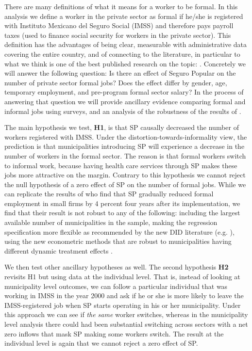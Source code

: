 \documentclass[oneside,11pt]{article}
\begin{document}
There are many definitions of what it means for a worker to be formal. In this analysis we define a worker in the private sector as formal if he/she is registered with Instituto Mexicano del Seguro Social (IMSS) and therefore pays payroll taxes (used to finance social security for workers in the private sector). This definition has the advantages of being clear, measurable with administrative data covering the entire country, and of connecting to the literature, in particular to what we think is one of the best published research on the topic: \cite{Campos}. Concretely we will answer the following question: Is there an effect of Seguro Popular on the number of private sector formal jobs? Does the effect differ by gender, age, temporary employment, and pre-program formal sector salary? In the process of answering that question we will provide ancillary evidence comparing formal and informal jobs using surveys, and an analysis of the robustness of the results of \cite{Campos}.

The main hypothesis we test, \textbf{H1}, is that SP causally decreased the number of workers registered with IMSS. Under the distortion-towards-informality view, the prediction is that municipalities introducing SP will experience a decrease in the number of workers in the formal sector. The reason is that formal workers switch to informal work, because having health care services through SP makes these jobs more attractive on the margin. Contrary to this hypothesis we  cannot reject the null hypothesis of a zero effect of SP on the number of formal jobs. While we can  replicate the results of \cite{Campos} who find that SP gradually reduced formal employment in small firms by 4 percent four years after its implementation, we find that their result is not robust to any of the following: including the largest available number of municipalities in the sample, making the regression specification more flexible as recommended by the new DID literature (e.g. \citep{Wooldridge}), using the new econometric methods that are robust to municipalities having different dynamic treatment effects \citep{deChaisemartin2020}.

We then test other ancillary hypotheses as well. The second hypothesis \textbf{H2} revisits H1 but using data at the individual level. That is, instead of looking at municipality level outcomes, we can follow a particular individual that was working in IMSS in the year 2000 and ask if he or she is more likely to leave the IMSS-registered job when SP starts operating in his or her municipality. Under this approach we can see if \textit{the same} worker switches, whereas in the municipality level analysis there could had been substantial switching across sectors with a net zero inflows that mask SP making some workers switch. The result at the individual level is again that we cannot reject a zero effect of SP. 
\end{document}
